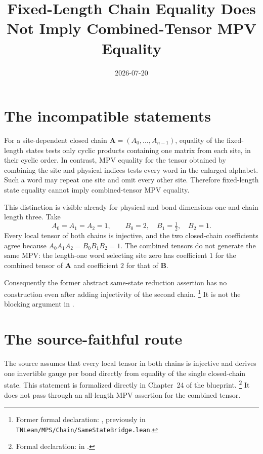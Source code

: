 \documentclass{article}
\title{Fixed-Length Chain Equality Does Not Imply Combined-Tensor MPV Equality}
\author{}
\date{2026-07-20}
\begin{document}
\maketitle

\section{The incompatible statements}

For a site-dependent closed chain
$\mathbf A=(A_0,\ldots,A_{n-1})$, equality of the fixed-length states tests
only cyclic products containing one matrix from each site, in their cyclic
order.  In contrast, MPV equality for the tensor obtained by combining the
site and physical indices tests every word in the enlarged alphabet.  Such a
word may repeat one site and omit every other site.  Therefore fixed-length
state equality cannot imply combined-tensor MPV equality.

This distinction is visible already for physical and bond dimensions one and
chain length three.  Take
\[
  A_0=A_1=A_2=1,
  \qquad
  B_0=2,\quad B_1=\tfrac12,\quad B_2=1.
\]
Every local tensor of both chains is injective, and the two closed-chain
coefficients agree because
$A_0A_1A_2=B_0B_1B_2=1$.  The combined tensors do not generate the same MPV:
the length-one word selecting site zero has coefficient $1$ for the combined
tensor of $\mathbf A$ and coefficient $2$ for that of $\mathbf B$.

Consequently the former abstract same-state reduction assertion has no
construction even after adding injectivity of the second chain.%
\footnote{Former formal declaration:
    , previously in
    \texttt{TNLean/MPS/Chain/SameStateBridge.lean}.}
It is not the blocking argument in
\cite[Theorem~\textup{thm:inj\_MPS}, lines~688--725]{Molnar2018NormalPEPS}.

\section{The source-faithful route}

The source assumes that every local tensor in both chains is injective and
derives one invertible gauge per bond directly from equality of the single
closed-chain state.  This statement is formalized directly in Chapter~24 of
the blueprint.%
\footnote{Formal declaration:
    in .}
It does not pass through an all-length MPV assertion for the combined tensor.
\end{document}
